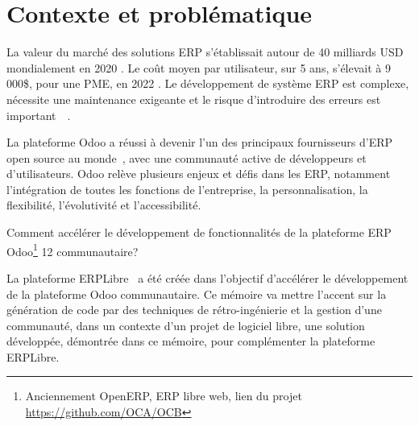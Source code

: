\label{sec:Introduction}  %


\section{Contexte et problématique}

La valeur du marché des solutions ERP s'établissait autour de 40 milliards USD mondialement en 2020 \cite{mordorintelligence_erp_2023,bigbang_erp_2023}. Le coût moyen par utilisateur, sur 5 ans, s'élevait à 9 000\$, pour une PME, en 2022 \cite{softwarepath_erp_2023}. Le développement de système ERP est complexe, nécessite une maintenance exigeante et le risque d’introduire des erreurs est important~\cite{method_erp_system_2022}~\cite{wu_2006}.

La plateforme Odoo a réussi à devenir l'un des principaux fournisseurs d'ERP open source au monde~\cite{ingenierie_system_information_hotel_odoo_2020}, avec une communauté active de développeurs et d'utilisateurs. Odoo relève plusieurs enjeux et défis dans les ERP, notamment l'intégration de toutes les fonctions de l'entreprise, la personnalisation, la flexibilité, l'évolutivité et l'accessibilité.

Comment accélérer le développement de fonctionnalités de la plateforme ERP Odoo\footnote{Anciennement OpenERP, ERP libre web, lien du projet \url{https://github.com/OCA/OCB}} 12 communautaire?

La plateforme ERPLibre~\cite{ref_erplibre} a été créée dans l’objectif d’accélérer le développement de la plateforme Odoo communautaire. Ce mémoire va mettre l’accent sur la génération de code par des techniques de rétro-ingénierie et la gestion d’une communauté, dans un contexte d’un projet de logiciel libre, une solution développée, démontrée dans ce mémoire, pour complémenter la plateforme ERPLibre.


